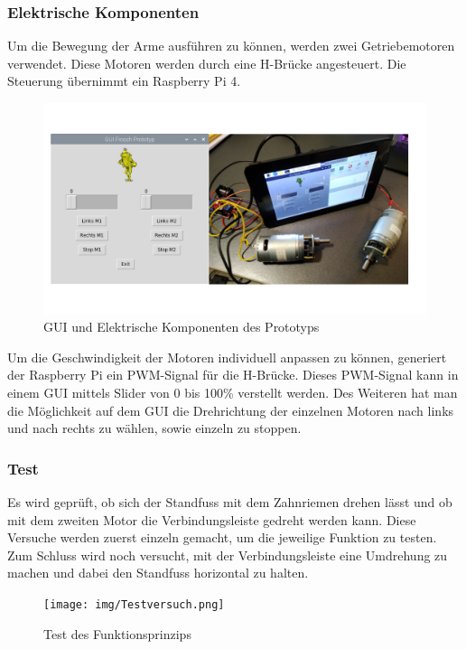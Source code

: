 \subsubsection{Elektrische Komponenten}
Um die Bewegung der Arme ausführen zu können, werden zwei Getriebemotoren verwendet. Diese Motoren werden durch eine H-Brücke angesteuert. Die Steuerung übernimmt ein Raspberry Pi 4.

\begin{figure}[H]
  \includegraphics[width=\textwidth]{img/Funktionsmuster Treppensteigen/GUI.png}
  \centering
  \caption{GUI und Elektrische Komponenten des Prototyps}
\end{figure}

\newpage

Um die Geschwindigkeit der Motoren individuell anpassen zu können, generiert der Raspberry Pi ein PWM-Signal für die H-Brücke. Dieses PWM-Signal kann in einem GUI mittels Slider von 0 bis 100\% verstellt werden. 
Des Weiteren hat man die Möglichkeit auf dem GUI die Drehrichtung der einzelnen Motoren nach links und nach rechts zu wählen, sowie einzeln zu stoppen.

\subsubsection{Test}

Es wird geprüft, ob sich der Standfuss mit dem Zahnriemen drehen lässt und ob mit dem zweiten Motor die Verbindungsleiste gedreht werden kann. Diese Versuche werden zuerst einzeln gemacht, um die jeweilige Funktion zu testen. Zum Schluss wird noch versucht, mit der Verbindungsleiste eine Umdrehung zu machen und dabei den Standfuss horizontal zu halten.

\begin{figure}[H]
  \texttt{[image: img/Testversuch.png]}
  \centering
  \caption{Test des Funktionsprinzips}
\end{figure}

